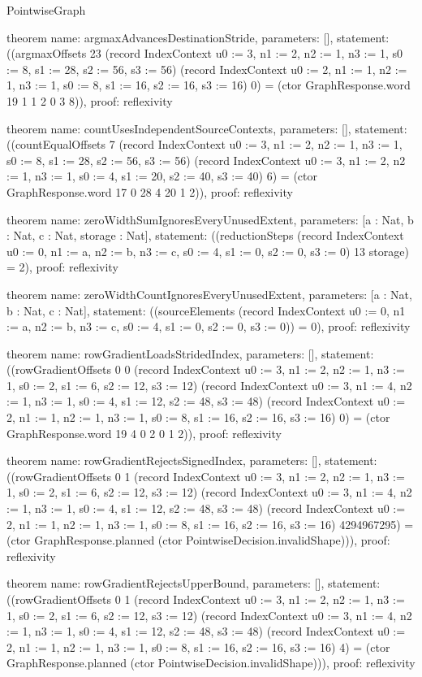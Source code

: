 \begin{lexlean}{PointwiseGraph}
\begin{semanticmodule}
theorem{
  name: argmaxAdvancesDestinationStride,
  parameters: [],
  statement: ((argmaxOffsets 23 (record IndexContext {u0 := 3, n1 := 2, n2 := 1, n3 := 1, s0 := 8, s1 := 28, s2 := 56, s3 := 56}) (record IndexContext {u0 := 2, n1 := 1, n2 := 1, n3 := 1, s0 := 8, s1 := 16, s2 := 16, s3 := 16}) 0) = (ctor GraphResponse.word 19 1 1 2 0 3 8)),
  proof: reflexivity{}
}

theorem{
  name: countUsesIndependentSourceContexts,
  parameters: [],
  statement: ((countEqualOffsets 7 (record IndexContext {u0 := 3, n1 := 2, n2 := 1, n3 := 1, s0 := 8, s1 := 28, s2 := 56, s3 := 56}) (record IndexContext {u0 := 3, n1 := 2, n2 := 1, n3 := 1, s0 := 4, s1 := 20, s2 := 40, s3 := 40}) 6) = (ctor GraphResponse.word 17 0 28 4 20 1 2)),
  proof: reflexivity{}
}

theorem{
  name: zeroWidthSumIgnoresEveryUnusedExtent,
  parameters: [a : Nat, b : Nat, c : Nat, storage : Nat],
  statement: ((reductionSteps (record IndexContext {u0 := 0, n1 := a, n2 := b, n3 := c, s0 := 4, s1 := 0, s2 := 0, s3 := 0}) 13 storage) = 2),
  proof: reflexivity{}
}

theorem{
  name: zeroWidthCountIgnoresEveryUnusedExtent,
  parameters: [a : Nat, b : Nat, c : Nat],
  statement: ((sourceElements (record IndexContext {u0 := 0, n1 := a, n2 := b, n3 := c, s0 := 4, s1 := 0, s2 := 0, s3 := 0})) = 0),
  proof: reflexivity{}
}

theorem{
  name: rowGradientLoadsStridedIndex,
  parameters: [],
  statement: ((rowGradientOffsets 0 0 (record IndexContext {u0 := 3, n1 := 2, n2 := 1, n3 := 1, s0 := 2, s1 := 6, s2 := 12, s3 := 12}) (record IndexContext {u0 := 3, n1 := 4, n2 := 1, n3 := 1, s0 := 4, s1 := 12, s2 := 48, s3 := 48}) (record IndexContext {u0 := 2, n1 := 1, n2 := 1, n3 := 1, s0 := 8, s1 := 16, s2 := 16, s3 := 16}) 0) = (ctor GraphResponse.word 19 4 0 2 0 1 2)),
  proof: reflexivity{}
}

theorem{
  name: rowGradientRejectsSignedIndex,
  parameters: [],
  statement: ((rowGradientOffsets 0 1 (record IndexContext {u0 := 3, n1 := 2, n2 := 1, n3 := 1, s0 := 2, s1 := 6, s2 := 12, s3 := 12}) (record IndexContext {u0 := 3, n1 := 4, n2 := 1, n3 := 1, s0 := 4, s1 := 12, s2 := 48, s3 := 48}) (record IndexContext {u0 := 2, n1 := 1, n2 := 1, n3 := 1, s0 := 8, s1 := 16, s2 := 16, s3 := 16}) 4294967295) = (ctor GraphResponse.planned (ctor PointwiseDecision.invalidShape))),
  proof: reflexivity{}
}

theorem{
  name: rowGradientRejectsUpperBound,
  parameters: [],
  statement: ((rowGradientOffsets 0 1 (record IndexContext {u0 := 3, n1 := 2, n2 := 1, n3 := 1, s0 := 2, s1 := 6, s2 := 12, s3 := 12}) (record IndexContext {u0 := 3, n1 := 4, n2 := 1, n3 := 1, s0 := 4, s1 := 12, s2 := 48, s3 := 48}) (record IndexContext {u0 := 2, n1 := 1, n2 := 1, n3 := 1, s0 := 8, s1 := 16, s2 := 16, s3 := 16}) 4) = (ctor GraphResponse.planned (ctor PointwiseDecision.invalidShape))),
  proof: reflexivity{}
}


\end{semanticmodule}
\end{lexlean}
